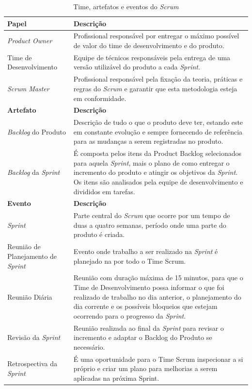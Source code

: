 \begin{table}[h!]
    \centering
    \caption{Time, artefatos e eventos do \textit{Scrum}\cite{Scrum}}
    \small
    \begin{tabular}{p{3cm} p{12cm}}
        \hline\hline
        \textbf{Papel} & \textbf{Descrição}\\ 
        \hline
        \textit{Product Owner} & Profissional responsável por entregar o máximo possível de valor do time de desenvolvimento e do produto.\\
        \hline
        Time de Desenvolvimento & Equipe de técnicos responsáveis pela entrega de uma versão utilizável do produto a cada \textit{Sprint}.\\
        \hline
        \textit{Scrum Master} & Profissional responsável pela fixação da teoria, práticas e regras do \textit{Scrum} e garantir que esta metodologia esteja em conformidade. \\
        \hline
        \textbf{Artefato} & \textbf{Descrição}\\  
        \hline
        \textit{Backlog} do Produto & Descrição de tudo o que o produto deve ter, estando este em constante evolução e sempre fornecendo de referência para as mudanças a serem registradas no produto.\\ 
        \hline
        \textit{Backlog} da \textit{Sprint} & É composta pelos itens da Product Backlog selecionados para aquela \textit{Sprint}, mais o plano de como entregar o incremento do produto e atingir os objetivos da \textit{Sprint}. Os itens são analisados pela equipe de desenvolvimento e divididos em tarefas. \\
        \hline
        \textbf{Evento} & \textbf{Descrição}\\
        \hline
        \textit{Sprint} & Parte central do \textit{Scrum} que ocorre por um tempo de duas a quatro semanas, período onde uma parte do produto é criada.\\
        \hline
        Reunião de Planejamento de \textit{Sprint} & Evento onde trabalho a ser realizado na \textit{Sprint} é planejado na por todo o Time Scrum. \\
        \hline
        Reunião Diária & Reunião com duração máxima de 15 minutos, para que o Time de Desenvolvimento possa informar o que foi realizado de trabalho no dia anterior, o planejamento do dia corrente e os possíveis bloqueios que estejam ocorrendo para o progresso da \textit{Sprint}.\\
        \hline
        Revisão da \textit{Sprint} & Reunião realizada ao final da \textit{Sprint} para revisar o incremento e adaptar o Backlog do Produto se necessário.\\
        \hline
        Retrospectiva da \textit{Sprint} & É uma oportunidade para o Time Scrum inspecionar a si próprio e criar um plano para melhorias a serem aplicadas na próxima Sprint.\\ 
        \hline\hline
    \end{tabular}
    \label{table:1}
  \end{table}

